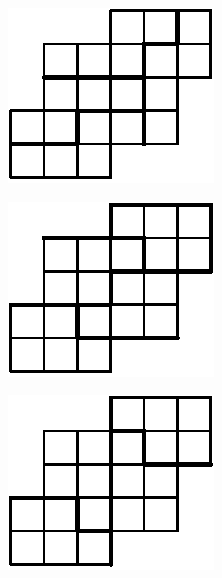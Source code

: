 \begin{enumerate}
\begin{figure}[H]
\centering
\includegraphics{images/chap11/ans14-2.eps}
\end{figure}

\begin{figure}[H]
\centering
\includegraphics{images/chap11/ans14-3.eps}
\end{figure}

\begin{figure}[H]
\centering
\includegraphics{images/chap11/ans14-4.eps}
\end{figure}


\end{enumerate}
